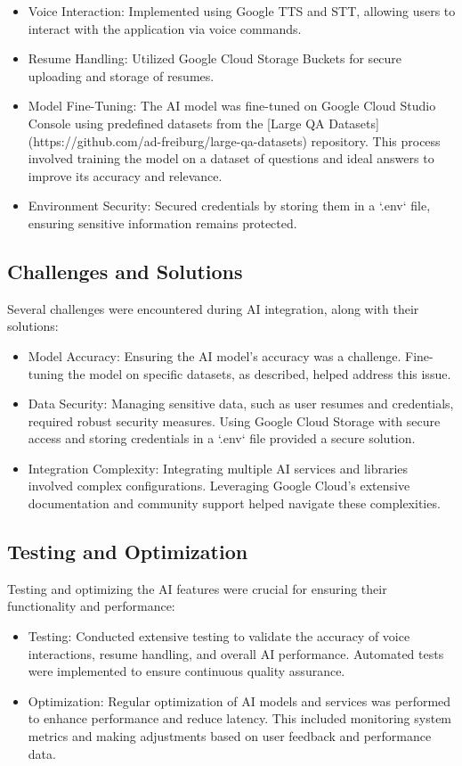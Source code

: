 \begin{itemize}
    \item Voice Interaction: Implemented using Google TTS and STT, allowing users to interact with the application via voice commands.
    \item Resume Handling: Utilized Google Cloud Storage Buckets for secure uploading and storage of resumes.
    \item Model Fine-Tuning: The AI model was fine-tuned on Google Cloud Studio Console using predefined datasets from the [Large QA Datasets](https://github.com/ad-freiburg/large-qa-datasets) repository. This process involved training the model on a dataset of questions and ideal answers to improve its accuracy and relevance.
    \item Environment Security: Secured credentials by storing them in a `.env` file, ensuring sensitive information remains protected.
\end{itemize}

\subsection{Challenges and Solutions}
Several challenges were encountered during AI integration, along with their solutions:

\begin{itemize}
    \item Model Accuracy: Ensuring the AI model's accuracy was a challenge. Fine-tuning the model on specific datasets, as described, helped address this issue.
    \item Data Security: Managing sensitive data, such as user resumes and credentials, required robust security measures. Using Google Cloud Storage with secure access and storing credentials in a `.env` file provided a secure solution.
    \item Integration Complexity: Integrating multiple AI services and libraries involved complex configurations. Leveraging Google Cloud's extensive documentation and community support helped navigate these complexities.
\end{itemize}

\subsection{Testing and Optimization}
Testing and optimizing the AI features were crucial for ensuring their functionality and performance:

\begin{itemize}
    \item Testing: Conducted extensive testing to validate the accuracy of voice interactions, resume handling, and overall AI performance. Automated tests were implemented to ensure continuous quality assurance.
    \item Optimization: Regular optimization of AI models and services was performed to enhance performance and reduce latency. This included monitoring system metrics and making adjustments based on user feedback and performance data.
\end{itemize}

